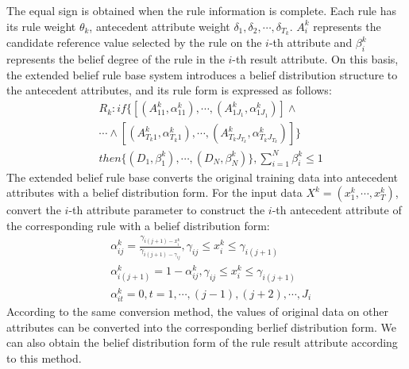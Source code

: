 \documentclass{ieeeaccess}
\begin{document}
The equal sign is obtained when the rule information is complete. Each rule has its rule weight $\theta_k$, antecedent attribute weight $\delta_{1},\delta_{2},\cdots,\delta_{T_k}$.
$A_i^k$ represents the candidate reference value selected by the rule on the $i$-th attribute and $\beta_i^k$ represents the belief degree of the rule in the $i$-th result attribute.
On this basis, the extended belief rule base system introduces a belief distribution structure to the antecedent attributes, and its rule form is expressed as follows:
\begin{equation}
    \begin{split}
        &R_k:if\{[(A_{11}^k,\alpha_{11}^k),\cdots,(A_{1J_1}^k,\alpha_{1J_1}^k)] \wedge \\
        &\cdots \wedge [(A_{T_k1}^k,\alpha_{T_k1}^k), \cdots,(A_{T_kJ_{T_k}}^k,\alpha_{T_kJ_{T_k}}^k)]\}\\
        &then\{(D_1,\beta_1^k),\cdots,(D_N,\beta_N^k)\},\sum_{i=1}^N\beta_i^k\leq1
    \end{split}
\end{equation}
The extended belief rule base converts the original training data into antecedent attributes with a belief distribution form.
For the input data $X^k=(x_1^k,\cdots,x_T^k)$, convert the $i$-th attribute parameter to construct the $i$-th antecedent attribute of the corresponding rule with a belief distribution form:
\begin{equation}
    \begin{split}
        &\alpha_{ij}^k=\frac{\gamma_{i(j+1)-x_i^k}}{\gamma_{i(j+1)-\gamma_{ij}}},\gamma_{ij}\leq x_i^k\leq \gamma_{i(j+1)}\\
        &\alpha_{i(j+1)}^k=1-\alpha_{ij}^k,\gamma_{ij}\leq x_i^k\leq \gamma_{i(j+1)} \\
        &\alpha_{it}^k=0,t=1,\cdots,(j-1),(j+2),\cdots,J_i
    \end{split}
\end{equation}
According to the same conversion method, the values of original data on other attributes can be converted into the corresponding berlief distribution form.
We can also obtain the belief distribution form of the rule result attribute according to this method.
\end{document}
